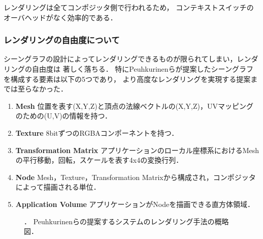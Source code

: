 レンダリングは全てコンポジッタ側で行われるため，
コンテキストスイッチのオーバヘッドがなく効率的である．

\subsubsection*{レンダリングの自由度について}

シーングラフの設計によってレンダリングできるものが限られてしまい，レンダリングの自由度は
著しく落ちる．
特にPeuhkurinenらが提案したシーングラフを構成する要素は以下の5つであり，
より高度なレンダリングを実現する提案までは至らなかった．

\begin{enumerate}
  \item \textbf{Mesh}
        位置を表す(X,Y,Z)と頂点の法線ベクトルの(X,Y,Z)，UVマッピングのための(U,V)の情報を持つ．
  \item \textbf{Texture}
        8bitずつのRGBAコンポーネントを持つ．
  \item \textbf{Transformation Matrix}
        アプリケーションのローカル座標系におけるMeshの平行移動，回転，スケールを表す4x4の変換行列．
  \item \textbf{Node}
        Mesh，Texture，Transformation Matrixから構成され，コンポジッタによって描画される単位．
  \item \textbf{Application Volume}
        アプリケーションがNodeを描画できる直方体領域．
\end{enumerate}

\begin{figure}[htbp]
  \centering
  \caption{．
    Peuhkurinenら\cite{peuhkurinen}の提案するシステムのレンダリング手法の概略図．
  }
  \label{fig:peuhkurinen-rendering}
\end{figure}


